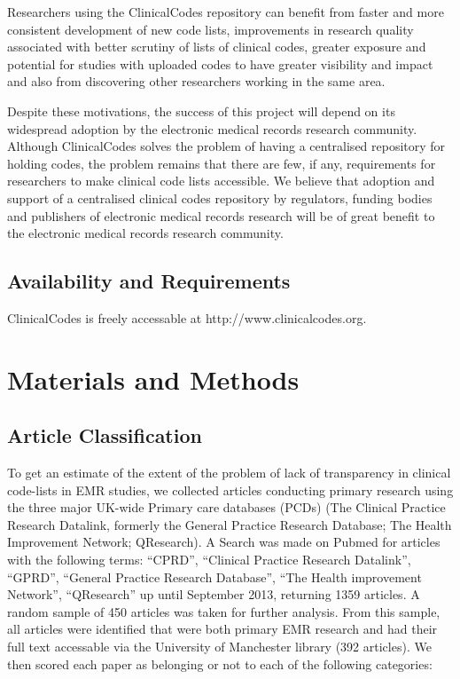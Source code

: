 \documentclass[10pt]{article}
\begin{document}
Researchers using the ClinicalCodes repository can benefit from faster and more consistent development of new code lists, improvements in research quality associated with better scrutiny of lists of clinical codes, greater exposure and potential for studies with uploaded codes to have greater visibility and impact and also from discovering other researchers working in the same area.

Despite these motivations, the success of this project will depend on its widespread adoption by the electronic medical records research community. Although ClinicalCodes solves the problem of having a centralised repository for holding codes, the problem remains that there are few, if any, requirements for researchers to make clinical code lists accessible. We believe that adoption and support of a centralised clinical codes repository by regulators, funding bodies and publishers of electronic medical records research will be of great benefit to the electronic medical records research community.

\subsection*{Availability and Requirements}


ClinicalCodes is freely accessable at http://www.clinicalcodes.org.

\section*{Materials and Methods}

\subsection*{Article Classification}

To get an estimate of the extent of the problem of lack of transparency in clinical code-lists in EMR studies, we collected articles conducting primary research using the three major UK-wide Primary care databases (PCDs) (The Clinical Practice Research Datalink, formerly the General Practice Research Database; The Health Improvement Network; QResearch).  A Search was made on Pubmed for articles with the following terms: ``CPRD'', ``Clinical Practice Research Datalink'', ``GPRD'', ``General Practice Research Database'', ``The Health improvement Network'', ``QResearch'' up until September 2013, returning 1359 articles.  A random sample of 450 articles was taken for further analysis.  From this sample, all articles were identified that were both primary EMR research and had their full text accessable via the University of Manchester library (392 articles). We then scored each paper as belonging or not to each of the following categories:
\end{document}

